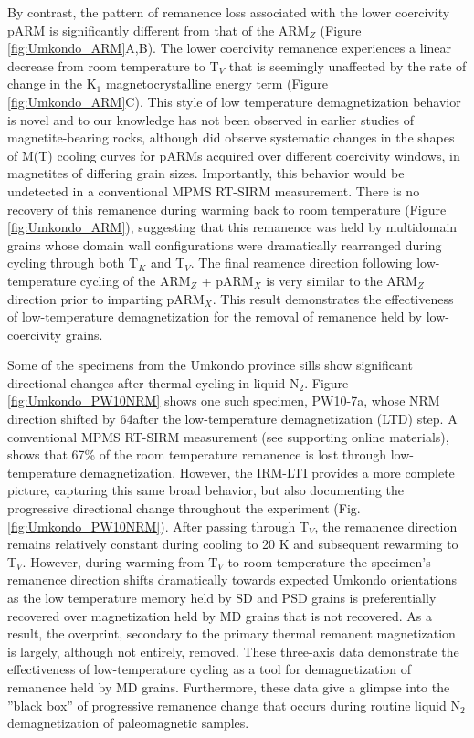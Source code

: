 \documentclass[draft,gc]{AGUTeX}
\begin{document}
\begin{article}
By contrast, the pattern of remanence loss associated with the lower coercivity pARM is significantly different from that of the ARM$_{Z}$ (Figure \ref{fig:Umkondo_ARM}A,B). The lower coercivity remanence experiences a linear decrease from room temperature to T$_{V}$ that is seemingly unaffected by the rate of change in the K$_{1}$ magnetocrystalline energy term (Figure \ref{fig:Umkondo_ARM}C). This style of low temperature demagnetization behavior is novel and to our knowledge has not been observed in earlier studies of magnetite-bearing rocks, although \cite{Muxworthy2003a} did observe systematic changes in the shapes of M(T) cooling curves for pARMs acquired over different coercivity windows, in magnetites of differing grain sizes. Importantly, this behavior would be undetected in a conventional MPMS RT-SIRM measurement. There is no recovery of this remanence during warming back to room temperature (Figure \ref{fig:Umkondo_ARM}), suggesting that this remanence was held by multidomain grains whose domain wall configurations were dramatically rearranged during cycling through both T$_{K}$ and T$_{V}$. The final reamence direction following low-temperature cycling of the ARM$_{Z}$ + pARM$_{X}$ is very similar to the ARM$_{Z}$ direction prior to imparting pARM$_{X}$. This result demonstrates  the effectiveness of low-temperature demagnetization for the removal of remanence held by low-coercivity grains.

Some of the specimens from the Umkondo province sills show significant directional changes after thermal cycling in liquid N$_{2}$. Figure \ref{fig:Umkondo_PW10NRM} shows one such specimen, PW10-7a, whose NRM direction shifted by 64\textdegree after the low-temperature demagnetization (LTD) step. A conventional MPMS RT-SIRM measurement (see supporting online materials),  shows that 67\% of the room temperature remanence is lost through low-temperature demagnetization. However, the IRM-LTI provides a more complete picture, capturing this same broad behavior, but also documenting the progressive directional change throughout the experiment (Fig. \ref{fig:Umkondo_PW10NRM}). After passing through T$_{V}$, the remanence direction remains relatively constant during cooling to 20 K and subsequent rewarming to T$_{V}$. However, during warming from T$_{V}$ to room temperature the specimen's remanence direction shifts dramatically towards expected Umkondo orientations as the low temperature memory held by SD and PSD grains is preferentially recovered over magnetization held by MD grains that is not recovered. As a result, the overprint, secondary to the primary thermal remanent magnetization is largely, although not entirely, removed. These three-axis data demonstrate the effectiveness of low-temperature cycling as a tool for demagnetization of remanence held by MD grains. Furthermore, these data give a glimpse into the ''black box'' of progressive remanence change that occurs during routine liquid N$_2$ demagnetization of paleomagnetic samples.


\end{article}
\end{document}
